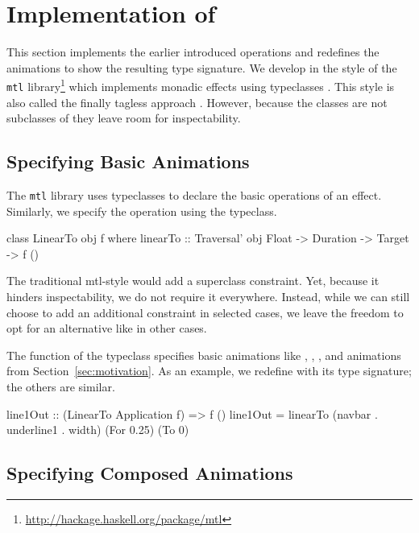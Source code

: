 \section{Implementation of \dsl{}}
\label{sec:detail}

This section implements the earlier introduced operations and redefines the animations to show the resulting type signature. We
develop \dsl{} in the style of the \texttt{mtl}
library\footnote{\url{http://hackage.haskell.org/package/mtl}} which implements
monadic effects using typeclasses \cite{DBLP:conf/afp/Jones95}.  This style is
also called the finally tagless approach \cite{DBLP:journals/jfp/CaretteKS09}.
However, because the \dsl{} classes are not subclasses of  they leave
room for inspectability.

\subsection{Specifying Basic Animations}

The \texttt{mtl} library uses typeclasses to declare the basic operations of an
effect. Similarly, we specify the  operation using
the  typeclass.

\begin{code}
class LinearTo obj f where
  linearTo :: Traversal' obj Float -> Duration -> Target -> f ()
\end{code}

The traditional mtl-style would add a  superclass constraint. Yet,
because it hinders inspectability, we do not require it everywhere. Instead,
while we can still choose to add an additional  constraint in selected
cases, we leave the freedom to opt for an alternative like  in
other cases.

The  function of the  typeclass specifies basic
animations like , ,
, and  animations from
Section~\ref{sec:motivation}. 
As an example, we redefine  with its type signature; the others 
are similar. 

\begin{code}
line1Out :: (LinearTo Application f) => f ()
line1Out = linearTo (navbar . underline1 . width) (For 0.25) (To 0)
\end{code}

\subsection{Specifying Composed Animations}

